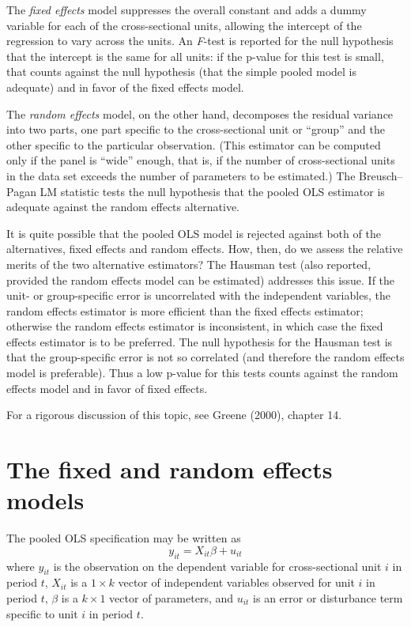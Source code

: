 The \emph{fixed effects} model suppresses the overall constant and
adds a dummy variable for each of the cross-sectional units, allowing
the intercept of the regression to vary across the units.  An
\emph{F}-test is reported for the null hypothesis that the intercept
is the same for all units: if the p-value for this test is small, that
counts against the null hypothesis (that the simple pooled model is
adequate) and in favor of the fixed effects model.

The \emph{random effects} model, on the other hand, decomposes the
residual variance into two parts, one part specific to the
cross-sectional unit or ``group'' and the other specific to the
particular observation.  (This estimator can be computed only if the
panel is ``wide'' enough, that is, if the number of cross-sectional
units in the data set exceeds the number of parameters to be
estimated.)  The Breusch--Pagan LM statistic tests the null hypothesis
that the pooled OLS estimator is adequate against the random
effects alternative.

It is quite possible that the pooled OLS model is rejected against
both of the alternatives, fixed effects and random effects. How, then,
do we assess the relative merits of the two alternative estimators?
The Hausman test (also reported, provided the random effects model can
be estimated) addresses this issue.  If the unit- or group-specific
error is uncorrelated with the independent variables, the random
effects estimator is more efficient than the fixed effects estimator;
otherwise the random effects estimator is inconsistent, in which case
the fixed effects estimator is to be preferred.  The null hypothesis
for the Hausman test is that the group-specific error is not so
correlated (and therefore the random effects model is preferable).
Thus a low p-value for this tests counts against the random effects
model and in favor of fixed effects.

For a rigorous discussion of this topic, see Greene (2000), chapter
14.

\section{The fixed and random effects models}
\label{panel-est}

The pooled OLS specification may be written as 
\[
y_{it} = X_{it}\beta + u_{it}
\]
where $y_{it}$ is the observation on the dependent variable for
cross-sectional unit $i$ in period $t$, $X_{it}$ is a $1\times k$
vector of independent variables observed for unit $i$ in period $t$,
$\beta$ is a $k\times 1$ vector of parameters, and $u_{it}$ is an error
or disturbance term specific to unit $i$ in period $t$.

